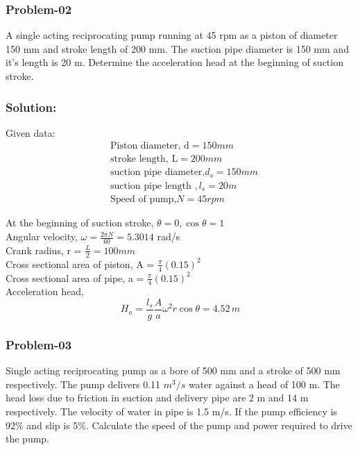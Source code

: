\documentclass{article}
\begin{document}
\begin{multicols*}{2}
      \subsubsection*{Problem-02}
      A single acting reciprocating pump running at 45 rpm as a piston of diameter 150 mm and stroke length of 200 mm. The suction pipe diameter is 150 mm and it's length is 20 m. Determine the acceleration head at the beginning of suction stroke. 
      \subsubsection*{Solution:}
      Given data:
      \begin{align*}
        &\text{Piston diameter, d} = 150 mm \\
        &\text{stroke length, L} = 200 mm \\
        &\text{suction pipe diameter,} d_s = 150 mm \\
        &\text{suction pipe length }, l_s = 20 m \\
        &\text{Speed of pump,} N = 45 rpm 
      \end{align*}
      
      At the beginning of suction stroke, $\theta = 0,  \cos \theta = 1$ \\
      Angular velocity, $\omega = \frac{2\pi N}{60} = 5.3014$ rad/s \\
      Crank radius, r = $\frac{L}{2} = 100 mm$ \\
      Cross sectional area of piston, A = $\frac{\pi}{4} (0.15)^2$ \\ 
      Cross sectional area of pipe, a = $\frac{\pi}{4} (0.15)^2$\\
      Acceleration head, $$H_a = \frac{l_s}{g} \frac{A}{a} \omega^2 r \cos \theta = 4.52 \, m $$

      \subsubsection*{Problem-03}
      Single acting reciprocating pump as a bore of 500 mm and a stroke of 500 mm respectively. The pump delivers 0.11 $m^3/s$ water against a head of 100 m. The head loss due to friction in suction and delivery pipe are 2 m  and 14 m respectively. The velocity of water in pipe is 1.5 m/s. If the pump efficiency is 92\% and slip is 5\%. Calculate the speed of the pump and power required to drive the pump. 


\end{multicols*}
\end{document}
